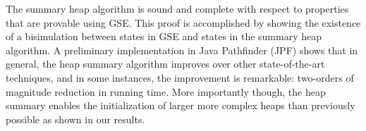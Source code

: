 


\begin{comment}
In
practical terms, any property that can be proved using GSE can also be
proved using summary heaps, and, any property proved by
summary heaps can also be proved by GSE. Of course, both require a
bound on heap reference chains and loops.
\end{comment}


The summary heap algorithm is sound and complete with respect to
properties that are provable using GSE. This proof is accomplished by
showing the existence of a bisimulation between states in GSE and
states in the summary heap algorithm.  A preliminary implementation in
Java Pathfinder (JPF) shows that in general, the heap summary
algorithm improves over other state-of-the-art techniques, and in some
instances, the improvement is remarkable: two-orders of magnitude
reduction in running time. More importantly though, the heap summary
enables the initialization of larger more complex heaps than
previously possible as shown in our results.



\begin{comment}
We implement the summary heap algorithm as an extension to \emph{Java
  PathFinder} (JPF) and compare it to GSE with lazy initialization in
\emph{Symbolic Pathfinder (SPF)} and an implementation of lazier\#
initialization in SPF.  The comparison shows on some examples up to a two-order of magnitude
reduction in the total time taken to explore the same state space
defined by the bound on the longest heap reference chain.  For these
examples, we show that where other GSE approaches are unable to
complete exploration within the provided time bound, the summary heap
finishes exploration in a few seconds.
\end{comment}

